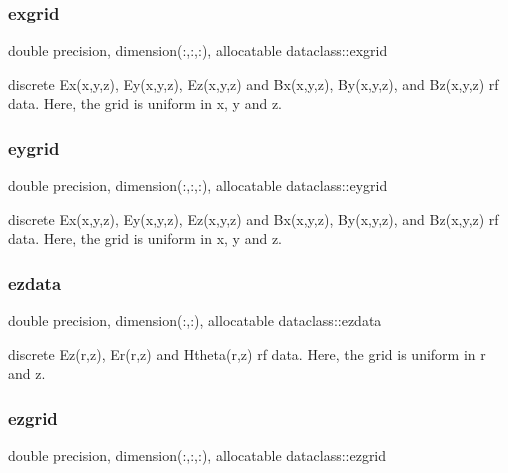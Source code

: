 \subsubsection{\texorpdfstring{exgrid}{exgrid}}
{\footnotesize\ttfamily double precision, dimension(\+:,\+:,\+:), allocatable dataclass\+::exgrid}



discrete Ex(x,y,z), Ey(x,y,z), Ez(x,y,z) and Bx(x,y,z), By(x,y,z), and Bz(x,y,z) rf data. Here, the grid is uniform in x, y and z. 

\mbox{\label{namespacedataclass_a85c21f161fb74970fc84639092c193dd}} 
\subsubsection{\texorpdfstring{eygrid}{eygrid}}
{\footnotesize\ttfamily double precision, dimension(\+:,\+:,\+:), allocatable dataclass\+::eygrid}



discrete Ex(x,y,z), Ey(x,y,z), Ez(x,y,z) and Bx(x,y,z), By(x,y,z), and Bz(x,y,z) rf data. Here, the grid is uniform in x, y and z. 

\mbox{\label{namespacedataclass_a2f3f7950dbca31f394856d31781256f3}} 
\subsubsection{\texorpdfstring{ezdata}{ezdata}}
{\footnotesize\ttfamily double precision, dimension(\+:,\+:), allocatable dataclass\+::ezdata}



discrete Ez(r,z), Er(r,z) and Htheta(r,z) rf data. Here, the grid is uniform in r and z. 

\mbox{\label{namespacedataclass_aff9491f2e1258faccd2530eace979c78}} 
\subsubsection{\texorpdfstring{ezgrid}{ezgrid}}
{\footnotesize\ttfamily double precision, dimension(\+:,\+:,\+:), allocatable dataclass\+::ezgrid}



